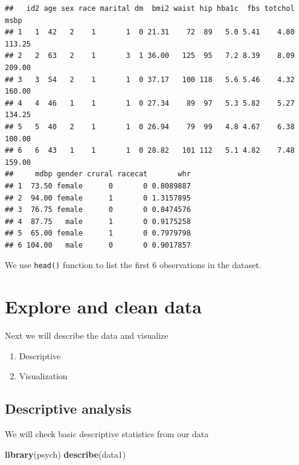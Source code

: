 \documentclass[]{book}
\newenvironment{Shaded}{\begin{snugshade}}{\end{snugshade}}
\newcommand{\KeywordTok}[1]{\textcolor[rgb]{0.13,0.29,0.53}{\textbf{#1}}}
\newcommand{\NormalTok}[1]{#1}
\providecommand{\tightlist}{%
  \setlength{\itemsep}{0pt}\setlength{\parskip}{0pt}}
\theoremstyle{definition}
\theoremstyle{definition}
\theoremstyle{remark}
\begin{document}
\begin{verbatim}
##   id2 age sex race marital dm  bmi2 waist hip hba1c  fbs totchol   msbp
## 1   1  42   2    1       1  0 21.31    72  89   5.0 5.41    4.80 113.25
## 2   2  63   2    1       3  1 36.00   125  95   7.2 8.39    8.09 209.00
## 3   3  54   2    1       1  0 37.17   100 118   5.6 5.46    4.32 160.00
## 4   4  46   1    1       1  0 27.34    89  97   5.3 5.82    5.27 134.25
## 5   5  40   2    1       1  0 26.94    79  99   4.8 4.67    6.38 100.00
## 6   6  43   1    1       1  0 28.82   101 112   5.1 4.82    7.48 159.00
##     mdbp gender crural racecat       whr
## 1  73.50 female      0       0 0.8089887
## 2  94.00 female      1       0 1.3157895
## 3  76.75 female      0       0 0.8474576
## 4  87.75   male      1       0 0.9175258
## 5  65.00 female      1       0 0.7979798
## 6 104.00   male      0       0 0.9017857
\end{verbatim}

We use \texttt{head()} function to list the first 6 observations in the
dataset.

\section{Explore and clean data}\label{explore-and-clean-data}

Next we will describe the data and visualize

\begin{enumerate}
\def\labelenumi{\arabic{enumi}.}
\tightlist
\item
  Descriptive
\item
  Visualization
\end{enumerate}

\subsection{Descriptive analysis}\label{descriptive-analysis}

We will check basic descriptive statistics from our data

\begin{Shaded}
\begin{Highlighting}[]
\KeywordTok{library}\NormalTok{(psych)}
\KeywordTok{describe}\NormalTok{(data1)}
\end{Highlighting}
\end{Shaded}
\end{document}
